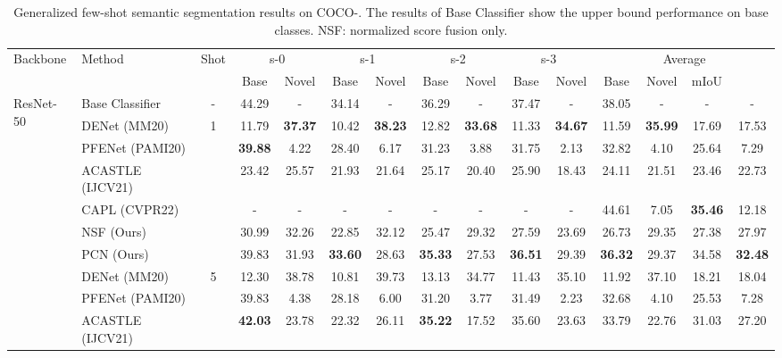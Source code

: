 \documentclass[journal]{IEEEtran}
\begin{document}
\begin{table*}[ht]
    \centering
    \caption{Generalized few-shot semantic segmentation results on COCO-. The results of Base Classifier show the upper bound performance on base classes. NSF: normalized score fusion only.}
\begin{adjustbox}{max width=\textwidth}
    \begin{tabular}{l|l|c|cccccccc|cccc}
    \hline 
         \multirow{2}{*}{Backbone} & \multirow{2}{*}{Method} & \multirow{2}{*}{Shot} & \multicolumn{2}{c}{s-0} &  \multicolumn{2}{c}{s-1} &  \multicolumn{2}{c}{s-2} &  \multicolumn{2}{c}{s-3} & \multicolumn{4}{c}{Average}  \\
         \cline{4-15}
         & & & Base & Novel & Base & Novel & Base & Novel & Base & Novel & Base & Novel & mIoU &  \\
         \hline
         \multirow{11}{*}{ResNet-50} & Base Classifier & - & 44.29 & - &	34.14 & - & 36.29 & - &	37.47 & - & 38.05 & - & - & - \\
         \cline{3-15}
         & DENet (MM20) & \multirow{6}{*}{1} & 11.79 & \textbf{37.37} & 10.42 & \textbf{38.23} & 12.82 & \textbf{33.68} & 11.33 & \textbf{34.67} & 11.59 & \textbf{35.99} & 17.69 & 17.53 \\
         & PFENet (PAMI20) & & \textbf{39.88} & 4.22 & 28.40 & 6.17 & 31.23 & 3.88 & 31.75 & 2.13 & 32.82 & 4.10 & 25.64 & 7.29 \\
         & ACASTLE (IJCV21) & & 23.42 & 25.57 & 21.93 & 21.64 & 25.17 & 20.40 & 25.90 & 18.43 & 24.11 & 21.51 & 23.46 & 22.73 \\
         & CAPL (CVPR22) & & - & - & - & - & - & - & - & - & 44.61 & 7.05 & \textbf{35.46} & 12.18 \\
         & NSF (Ours) & & 30.99 & 32.26 & 22.85 & 32.12 & 25.47 & 29.32 & 27.59 & 23.69 & 26.73 & 29.35 & 27.38 & 27.97 \\
         & PCN (Ours) & & 39.83 & 31.93 & \textbf{33.60} & 28.63 & \textbf{35.33} & 27.53 & \textbf{36.51} & 29.39 & \textbf{36.32} & 29.37 & 34.58 & \textbf{32.48} \\
         \cline{2-15}
         & DENet (MM20) & \multirow{6}{*}{5} & 12.30 & 38.78 & 10.81 & 39.73 & 13.13 & 34.77 & 11.43 & 35.10 & 11.92 & 37.10 & 18.21 & 18.04 \\
         & PFENet (PAMI20) & & 39.83 & 4.38 & 28.18 & 6.00 & 31.20 & 3.77 & 31.49 & 2.23 & 32.68 & 4.10 & 25.53 & 7.28 \\
         & ACASTLE (IJCV21) & & \textbf{42.03} & 23.78 & 22.32 & 26.11 & \textbf{35.22} & 17.52 & 35.60 & 23.63 & 33.79 & 22.76 & 31.03 & 27.20 \\

\end{tabular}
\end{adjustbox}
\end{table*}
\end{document}
